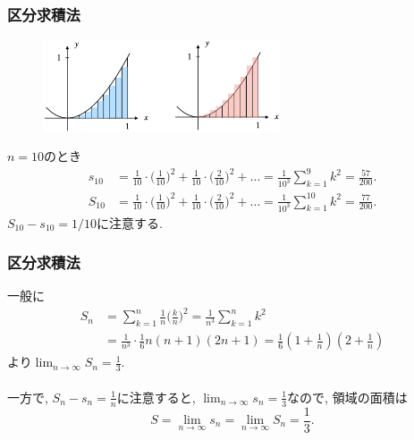 \begin{frame}
\frametitle{区分求積法}


\begin{figure}[htbp]
 \begin{center} 
  \includegraphics[width=70mm]{calculus12/RiemannSum2.png}
 \end{center}
\end{figure}

\vspace{-3mm}

$n=10$のとき
{\small 
\begin{align*}
s_{10} &= \frac{1}{10} \cdot \big(\frac{1}{10}\big)^2+\frac{1}{10} \cdot \big(\frac{2}{10}\big)^2+\dots 
= \frac{1}{10^3}\sum_{k=1}^9 k^2=\frac{57}{200}. \\
S_{10} &= \frac{1}{10} \cdot \big(\frac{1}{10}\big)^2+\frac{1}{10} \cdot \big(\frac{2}{10}\big)^2+\dots 
= \frac{1}{10^3}\sum_{k=1}^{10} k^2=\frac{77}{200}. 
\end{align*}
}
$S_{10}-s_{10}=1/10$に注意する. 
\end{frame}




\begin{frame}
\frametitle{区分求積法}

一般に
\begin{align*}
S_n &= \sum_{k=1}^n  \frac{1}{n} \big(\frac{k}{n}\big)^2 = \frac{1}{n^3}  \sum_{k=1}^n k^2 \\
& =  \frac{1}{n^3} \cdot  \frac{1}{6}n(n+1)(2n+1) = \frac{1}{6} (1+\frac{1}{n})(2+\frac{1}{n})
\end{align*}
より$\displaystyle \lim_{n\to \infty}S_n=\frac{1}{3}$. \\
\ \\

一方で, $S_n-s_n=\frac{1}{n}$に注意すると, $\displaystyle \lim_{n\to \infty}s_n=\frac{1}{3}$なので, 
領域の面積は
$$
S= \lim_{n\to \infty}s_n=\lim_{n\to \infty}S_n=\frac{1}{3}.
$$ 

\end{frame}


